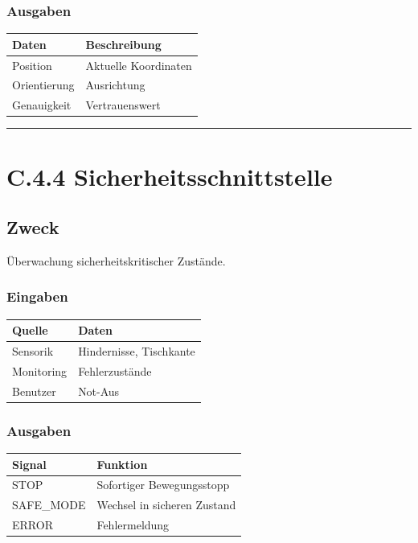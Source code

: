 \documentclass[
  a4paper,
  12pt,
  DIV=12,        %
  parskip=half,  %
  headings=small %
]{scrartcl}
\theoremstyle{definition}
\theoremstyle{definition}
\begin{document}
\subsubsection{Ausgaben}\label{ausgaben-2}

\begin{longtable}[]{@{}ll@{}}
\toprule\noalign{}
Daten & Beschreibung \\
\midrule\noalign{}
\endhead
\bottomrule\noalign{}
\endlastfoot
Position & Aktuelle Koordinaten \\
Orientierung & Ausrichtung \\
Genauigkeit & Vertrauenswert \\
\end{longtable}

\begin{center}\rule{0.5\linewidth}{0.5pt}\end{center}

\section{C.4.4
Sicherheitsschnittstelle}\label{c.4.4-sicherheitsschnittstelle}

\subsection{Zweck}\label{zweck-8}

Überwachung sicherheitskritischer Zustände.

\subsubsection{Eingaben}\label{eingaben-3}

\begin{longtable}[]{@{}ll@{}}
\toprule\noalign{}
Quelle & Daten \\
\midrule\noalign{}
\endhead
\bottomrule\noalign{}
\endlastfoot
Sensorik & Hindernisse, Tischkante \\
Monitoring & Fehlerzustände \\
Benutzer & Not-Aus \\
\end{longtable}

\subsubsection{Ausgaben}\label{ausgaben-3}

\begin{longtable}[]{@{}ll@{}}
\toprule\noalign{}
Signal & Funktion \\
\midrule\noalign{}
\endhead
\bottomrule\noalign{}
\endlastfoot
STOP & Sofortiger Bewegungsstopp \\
SAFE\_MODE & Wechsel in sicheren Zustand \\
ERROR & Fehlermeldung \\
\end{longtable}
\end{document}
